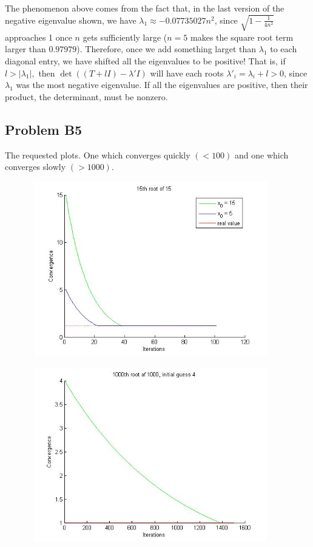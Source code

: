 \documentclass{article}
\begin{document}
The phenomenon above comes from the fact that, in the last version of the negative eigenvalue shown, we have $\lambda_1 \approx -0.07735027 n^2$, since $\sqrt{1 - \frac{1}{4n^2}}$ approaches 1 once $n$ gets sufficiently large ($n = 5$ makes the square root term larger than $0.97979$).
Therefore, once we add something larget than $\lambda_1$ to each diagonal entry, we have shifted all the eigenvalues to be positive!
That is, if $l > |\lambda_1|,$ then $\det((T + lI) - \lambda' I)$ will have each roots $\lambda'_i = \lambda_i + l > 0$, since $\lambda_1$ was the most negative eigenvalue.
If all the eigenvalues are positive, then their product, the determinant, must be nonzero.

\subsection{Problem B5}
The requested plots. One which converges quickly $(<100)$ and one which converges slowly $(>1000)$.

\includegraphics[height=3in, width=5in]{15rt15.jpg}

\includegraphics[height=3in, width=5in]{1000rt1000i4.jpg}
\end{document}
